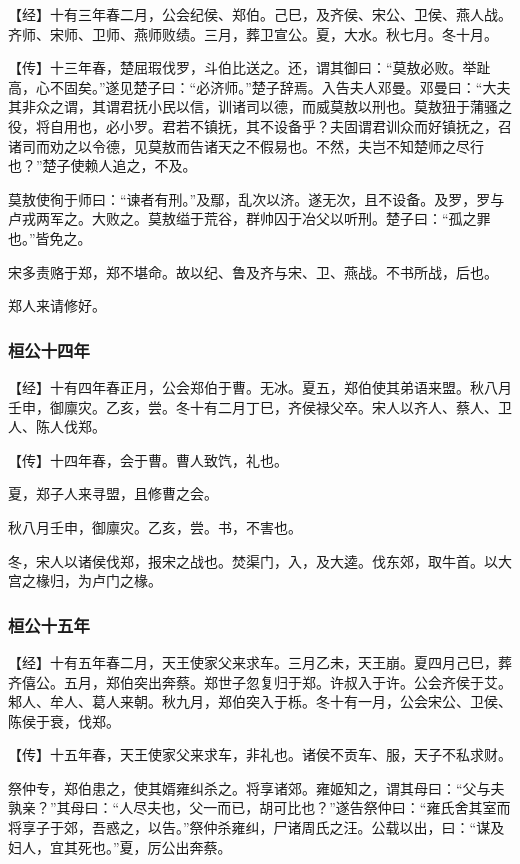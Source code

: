 \documentclass[]{article}
\begin{document}
【经】十有三年春二月，公会纪侯、郑伯。己巳，及齐侯、宋公、卫侯、燕人战。齐师、宋师、卫师、燕师败绩。三月，葬卫宣公。夏，大水。秋七月。冬十月。

【传】十三年春，楚屈瑕伐罗，斗伯比送之。还，谓其御曰：``莫敖必败。举趾高，心不固矣。''遂见楚子曰：``必济师。''楚子辞焉。入告夫人邓曼。邓曼曰：``大夫其非众之谓，其谓君抚小民以信，训诸司以德，而威莫敖以刑也。莫敖狃于蒲骚之役，将自用也，必小罗。君若不镇抚，其不设备乎？夫固谓君训众而好镇抚之，召诸司而劝之以令德，见莫敖而告诸天之不假易也。不然，夫岂不知楚师之尽行也？''楚子使赖人追之，不及。

莫敖使徇于师曰：``谏者有刑。''及鄢，乱次以济。遂无次，且不设备。及罗，罗与卢戎两军之。大败之。莫敖缢于荒谷，群帅囚于冶父以听刑。楚子曰：``孤之罪也。''皆免之。

宋多责赂于郑，郑不堪命。故以纪、鲁及齐与宋、卫、燕战。不书所战，后也。

郑人来请修好。

\hypertarget{header-n298}{%
\subsubsection{桓公十四年}\label{header-n298}}

【经】十有四年春正月，公会郑伯于曹。无冰。夏五，郑伯使其弟语来盟。秋八月壬申，御廪灾。乙亥，尝。冬十有二月丁巳，齐侯禄父卒。宋人以齐人、蔡人、卫人、陈人伐郑。

【传】十四年春，会于曹。曹人致饩，礼也。

夏，郑子人来寻盟，且修曹之会。

秋八月壬申，御廪灾。乙亥，尝。书，不害也。

冬，宋人以诸侯伐郑，报宋之战也。焚渠门，入，及大逵。伐东郊，取牛首。以大宫之椽归，为卢门之椽。

\hypertarget{header-n306}{%
\subsubsection{桓公十五年}\label{header-n306}}

【经】十有五年春二月，天王使家父来求车。三月乙未，天王崩。夏四月己巳，葬齐僖公。五月，郑伯突出奔蔡。郑世子忽复归于郑。许叔入于许。公会齐侯于艾。邾人、牟人、葛人来朝。秋九月，郑伯突入于栎。冬十有一月，公会宋公、卫侯、陈侯于衰，伐郑。

【传】十五年春，天王使家父来求车，非礼也。诸侯不贡车、服，天子不私求财。

祭仲专，郑伯患之，使其婿雍纠杀之。将享诸郊。雍姬知之，谓其母曰：``父与夫孰亲？''其母曰：``人尽夫也，父一而已，胡可比也？''遂告祭仲曰：``雍氏舍其室而将享子于郊，吾惑之，以告。''祭仲杀雍纠，尸诸周氏之汪。公载以出，曰：``谋及妇人，宜其死也。''夏，厉公出奔蔡。
\end{document}
